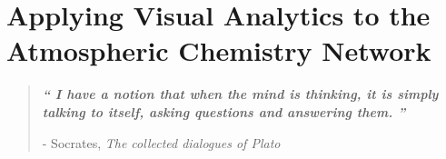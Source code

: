 \documentclass[twoside,openleft,reqno,a4paper,final]{book}
\author{Dan Ellis }
\date{March 2019}
\def\blankpage{%
      \clearpage%
      \thispagestyle{empty}%
      \addtocounter{page}{-2}%
      \null%
      \clearpage}
\begin{document}


\titleformat{\paragraph}[hang]{\normalfont\normalsize\bfseries}{\theparagraph}{1em}{}

\setcounter{secnumdepth}{5}
\setcounter{tocdepth}{4}
\setcounter{page}{300}
\setcounter{chapter}{2}

\cleardoublepage{}
\chapter{ Applying Visual Analytics to the Atmospheric Chemistry Network}
\cleardoublepage{}
\restoregeometry
\vspace*{0.15\paperheight} 



\begin{center}
\begin{quotation}
  \large{\emph{\textbf{`` I have a notion that when the mind is thinking, it is simply talking to itself, asking questions and answering them. ''} }  }  \\
  \begin{flushright}
  - Socrates, \textit{The collected dialogues of Plato} 

  \end{flushright}
 \end{quotation}
\end{center}


\doublespacing

\newpage
\setlength{\footnotesep}{0.5cm}
\raggedbottom %


\tableofcontents
\newpage
%
  
  
 
 
 

% 


 

% 
\end{document}
